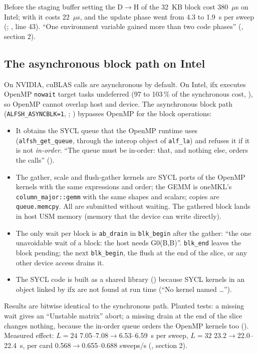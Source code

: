 Before the staging buffer setting the D$\to$H of the 32~KB block cost 380~$\mu$s on Intel; with  it costs 22~$\mu$s, and the update phase went from 4.3 to 1.9~s per sweep (; , line 43). %
``One environment variable gained more than two code phases'' (, section 2).

\subsection{The asynchronous block path on Intel}
\label{sec:asyncblk}

On NVIDIA, cuBLAS calls are asynchronous by default. On Intel, ifx executes OpenMP \texttt{nowait} target tasks undeferred (97 to 103\,\% of the synchronous cost, ), so OpenMP cannot overlap host and device. The asynchronous block path (\texttt{ALFSH\_ASYNCBLK=1}, ; ) bypasses OpenMP for the block operations:
\begin{itemize}
\item It obtains the SYCL queue that the OpenMP runtime uses (\texttt{alfsh\_get\_queue}, through the interop object of \texttt{alf\_la}) and refuses it if it is not \emph{in-order}. ``The queue must be in-order: that, and nothing else, orders the calls'' ().
\item The gather, scale and flush-gather kernels are SYCL ports of the OpenMP kernels with the same expressions and order; the GEMM is oneMKL's \texttt{column\_major::gemm} with the same shapes and scalars; copies are \texttt{queue.memcpy}. All are submitted without waiting. The gathered block lands in host USM memory (memory that the device can write directly).
\item The only wait per block is \texttt{ab\_drain} in \texttt{blk\_begin} after the gather: ``the one unavoidable wait of a block: the host needs G0(B,B)''. \texttt{blk\_end} leaves the block pending; the next \texttt{blk\_begin}, the flush at the end of the slice, or any other device access drains it.
\item The SYCL code is built as a shared library () because SYCL kernels in an object linked by ifx are not found at run time (``No kernel named \ldots'').
\end{itemize}
Results are bitwise identical to the synchronous path. Planted tests: a missing wait gives an ``Unstable matrix'' abort; a missing drain at the end of the slice changes nothing, because the in-order queue orders the OpenMP kernels too (). Measured effect: $L=24$ 7.05--7.08$\to$6.53--6.59~s per sweep, $L=32$ 23.2$\to$22.0--22.4~s, per card 0.568$\to$0.655--0.688 sweeps/s (, section 2). %

